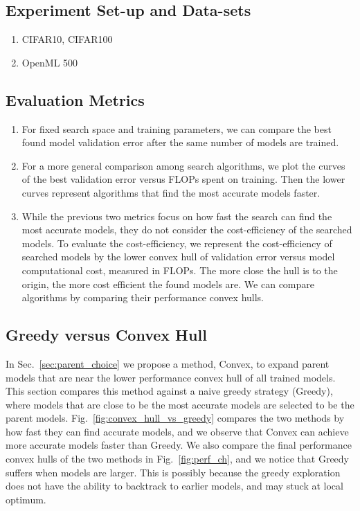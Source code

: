 \documentclass{article}
\begin{document}
\subsection{Experiment Set-up and Data-sets}

\begin{enumerate}
    \item CIFAR10, CIFAR100
    \item OpenML 500
\end{enumerate}


\subsection{Evaluation Metrics}

\begin{enumerate}
    \item For fixed search space and training parameters, we can 
    compare the best found model validation error after the same number of 
    models are trained.
    \item For a more general comparison among search algorithms, we plot the curves of the best validation error versus FLOPs spent on training. Then the lower curves represent algorithms that find the most accurate models faster.
    \item While the previous two metrics focus on how fast the search can find the most accurate models, they do not consider the cost-efficiency of the searched models. To evaluate the cost-efficiency, we represent the cost-efficiency of searched models by the lower convex hull of validation error versus model computational cost, measured in FLOPs. The more close the hull is to the origin, the more cost efficient the found models are. We can compare algorithms by comparing their performance convex hulls. 
\end{enumerate}


\subsection{Greedy versus Convex Hull}
\label{sec:greedy_vs_convex}

In Sec.~\ref{sec:parent_choice} we propose a method, Convex, to expand parent models that are near the lower performance convex hull of all trained models. This section compares this method against a naive greedy strategy (Greedy), where models that are close to be the most accurate models are selected to be the parent models. Fig.~\ref{fig:convex_hull_vs_greedy} compares the two methods by how fast they can find accurate models, and we observe that Convex can achieve more accurate models faster than Greedy. We also compare the final performance convex hulls of the two methods in Fig.~\ref{fig:perf_ch}, and we notice that Greedy suffers when models are larger. This is possibly because the greedy exploration does not have the ability to backtrack to earlier models, and may stuck at local optimum.
\end{document}

